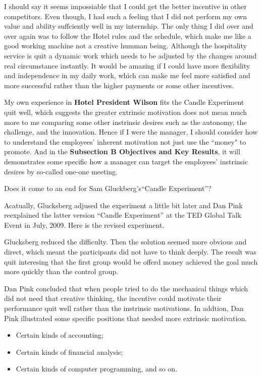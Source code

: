 \documentclass[12pt,onecolumn,a4paper]{IEEEtran}
\begin{document}
I should say it seems impossiable that I could get the better incentive in other competitors. Even though, I had such a feeling that I did not perform my own value and ability suffciently well in my internship. The only thing I did over and over again was to follow the Hotel rules and the schedule, which make me like a good working machine not a creative humman being. Although the hospitality service is quit a dynamic work which needs to be adjusted by the changes around real circumstance instantly. It would be amazing if I could have more flexibility and independence in my daily work, which can make me feel more satisfied and more successful rather than the higher payments or some other incentives. 

My own experience in \textbf{Hotel President Wilson} fits the Candle Experiment quit well, which suggests the greater extrinsic motivation does not mean much more to me comparing some other instrinsic desires such as the autonomy, the challenge, and the innovation. Hence if I were the manager, I should consider how to understand the employees' inherent motivation not just use the ``money" to promote. And in the \textbf{Subsection B Objectives and Key Results}, it will demonstrates some specific how a manager can target the employees' instrinsic desires by so-called one-one meeting.

Does it come to an end for Sam Gluckberg's``Candle Experiment''? 

Acatually, Glucksberg adjused the experiment a little bit later and Dan Pink reexplained the latter version ``Candle Experiment'' at the TED Global Talk Event in July, 2009\cite{DanPink}. Here is the revised experiment.

Glucksberg reduced the difficulty. Then the solution seemed more obvious and direct, which meant the participants did not have to think deeply. The result was quit interesing that the first group would be offerd money achieved the goal much more quickly than the control group.

Dan Pink\cite{DanPink} concluded that when people tried to do the mechanical things which did not need that creative thinking, the incentive could motivate their performance quit well rather than the instrinsic motivations. In addtion, Dan Pink illustrated some specific positions\cite{DanPink} that needed more extrinsic motivation.

\begin{itemize}
  \item Certain kinds of accounting;
  \item Certain kinds of financial analysis;
  \item Certain kinds of computer programming, and so on.
\end{itemize}
\end{document}
